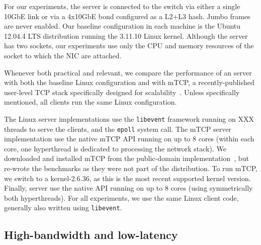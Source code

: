 For our experiments, the server is connected to the switch via either
a single 10GbE link or via a 4x10GbE bond configured as a L2+L3 hash.
Jumbo frames are never enabled.  Our
baseline configuration in each machine is the Ubuntu 12.04.4 LTS
distribution running the 3.11.10 Linux kernel.  Although the server
has two sockets, our experiments use only the CPU and memory resources
of the socket to which the NIC are attached.  



%




Whenever both practical and relevant, we compare the performance of an
\ix server with both the baseline Linux configuration and with mTCP, a
recently-published user-level TCP stack specifically designed for
scalability~\cite{jeong2014mtcp}.  Unless specifically mentioned, all
clients run the same Linux configuration. 

The Linux server implementations use the \texttt{libevent} framework
running on XXX threads to serve the clients, and the \texttt{epoll} system call. The mTCP server
implementation use the native mTCP API running on up to 8 cores
(within each core, one hyperthread is dedicated to processing the
network stack).  We downloaded and installed mTCP
from the public-domain implementation~\cite{url:mtcp}, but re-wrote the
benchmarks as they were not part of the distribution.  To run mTCP, we
switch to a kernel-2.6.36, as this is the most recent supported kernel
version.
Finally, \ix server use
the native \ix API running on up to 8 cores (using symmetrically both
hyperthreads).  For all experiments, we use the same Linux client code, generally also written using \texttt{libevent}.


\subsection{High-bandwidth and low-latency}
\label{sec:eval:netpipe}


